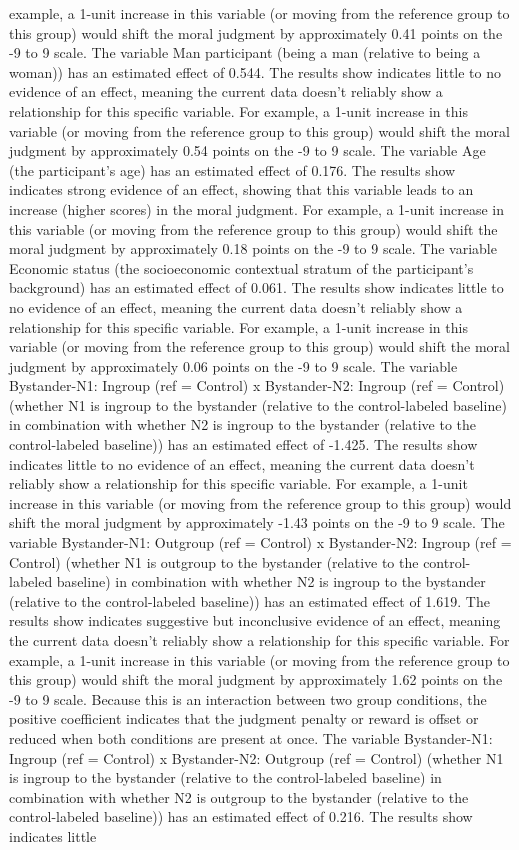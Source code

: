 \documentclass[11pt]{article}
\begin{document}
example, a 1-unit increase in this variable (or moving from the reference group to this group) would shift the moral judgment by approximately 0.41 points on the -9 to 9 scale. The variable Man participant (being a man (relative to being a woman)) has an estimated effect of 0.544. The results show indicates little to no evidence of an effect, meaning the current data doesn't reliably show a relationship for this specific variable. For example, a 1-unit increase in this variable (or moving from the reference group to this group) would shift the moral judgment by approximately 0.54 points on the -9 to 9 scale. The variable Age (the participant's age) has an estimated effect of 0.176. The results show indicates strong evidence of an effect, showing that this variable leads to an increase (higher scores) in the moral judgment. For example, a 1-unit increase in this variable (or moving from the reference group to this group) would shift the moral judgment by approximately 0.18 points on the -9 to 9 scale. The variable Economic status (the socioeconomic contextual stratum of the participant's background) has an estimated effect of 0.061. The results show indicates little to no evidence of an effect, meaning the current data doesn't reliably show a relationship for this specific variable. For example, a 1-unit increase in this variable (or moving from the reference group to this group) would shift the moral judgment by approximately 0.06 points on the -9 to 9 scale. The variable Bystander-N1: Ingroup (ref = Control) x Bystander-N2: Ingroup (ref = Control) (whether N1 is ingroup to the bystander (relative to the control-labeled baseline) in combination with whether N2 is ingroup to the bystander (relative to the control-labeled baseline)) has an estimated effect of -1.425. The results show indicates little to no evidence of an effect, meaning the current data doesn't reliably show a relationship for this specific variable. For example, a 1-unit increase in this variable (or moving from the reference group to this group) would shift the moral judgment by approximately -1.43 points on the -9 to 9 scale. The variable Bystander-N1: Outgroup (ref = Control) x Bystander-N2: Ingroup (ref = Control) (whether N1 is outgroup to the bystander (relative to the control-labeled baseline) in combination with whether N2 is ingroup to the bystander (relative to the control-labeled baseline)) has an estimated effect of 1.619. The results show indicates suggestive but inconclusive evidence of an effect, meaning the current data doesn't reliably show a relationship for this specific variable. For example, a 1-unit increase in this variable (or moving from the reference group to this group) would shift the moral judgment by approximately 1.62 points on the -9 to 9 scale. Because this is an interaction between two group conditions, the positive coefficient indicates that the judgment penalty or reward is offset or reduced when both conditions are present at once. The variable Bystander-N1: Ingroup (ref = Control) x Bystander-N2: Outgroup (ref = Control) (whether N1 is ingroup to the bystander (relative to the control-labeled baseline) in combination with whether N2 is outgroup to the bystander (relative to the control-labeled baseline)) has an estimated effect of 0.216. The results show indicates little 
\end{document}
